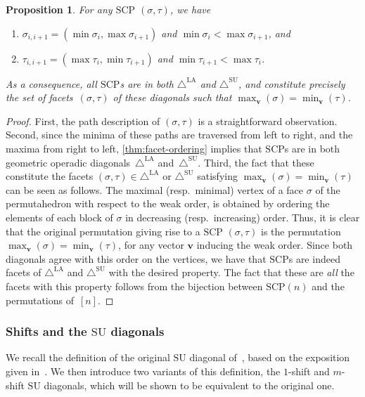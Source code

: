 \documentclass{amsart}
\newtheorem{proposition}[theorem]{Proposition}
\theoremstyle{definition}
\renewcommand{\b}[1]{{\boldsymbol{#1}}} %
\newcommand{\resp}{resp.~} %
\renewcommand{\b}[1]{\boldsymbol{#1}} %
\newcommand{\SU}{\mathrm{SU}}
\newcommand{\SUD}{\triangle^{\mathrm{SU}}}
\newcommand{\LAD}{\triangle^{\mathrm{LA}}}
\newcommand{\SCP}{\mathrm{SCP}}
\begin{document}
\begin{proposition} 
\label{lem:SCP-path-desc}
For any $\SCP$ $(\sigma,\tau)$, we have
\begin{enumerate}
\item $ \sigma_{i,i+1} = ( \min \sigma_i, \max \sigma_{i+1} )$ and $\min \sigma_i< \max \sigma_{i+1}$, and
\item $  \tau_{i,i+1} =  ( \max \tau_i, \min \tau_{i+1} )$ and $\min \tau_{i+1}< \max \tau_{i}$.
\end{enumerate}
As a consequence, all $\SCP$s are in both $\LAD$ and $\SUD$, and constitute precisely the set of facets~$(\sigma,\tau)$ of these diagonals such that $\max_{\b{v}}(\sigma) = \min_{\b{v}}(\tau)$.
\end{proposition}
\begin{proof}
First, the path description of $(\sigma,\tau)$ is a straightforward observation. 
Second, since the minima of these paths are traversed from left to right, and the maxima from right to left, \cref{thm:facet-ordering} implies that $\SCP$s are in both geometric operadic diagonals~$\LAD$ and~$\SUD$.
Third, the fact that these constitute the facets $(\sigma,\tau) \in \LAD$ or $\SUD$ satisfying $\max_{\b{v}}(\sigma) = \min_{\b{v}}(\tau)$ can be seen as follows.
The maximal (\resp minimal) vertex of a face $\sigma$ of the permutahedron with respect to the weak order, is obtained by ordering the elements of each block of $\sigma$ in decreasing (\resp increasing) order. 
Thus, it is clear that the original permutation giving rise to a $\SCP$ $(\sigma,\tau)$ is the permutation $\max_{\b{v}}(\sigma)=\min_{\b{v}}(\tau)$, for any vector $\b{v}$ inducing the weak order.
Since both diagonals agree with this order on the vertices, we have that $\SCP$s are indeed facets of $\LAD$ and $\SUD$ with the desired property. 
The fact that these are \emph{all} the facets with this property follows from the bijection between $\SCP(n)$ and the permutations of~$[n]$.
\end{proof}



\subsubsection{Shifts and the $\SU$ diagonals}
\label{subsec:SU-shifts}

We recall the definition of the original $\SU$ diagonal of~\cite{SaneblidzeUmble}, based on the exposition given in~\cite{SaneblidzeUmble-comparingDiagonals}.
We then introduce two variants of this definition, the $1$-shift and $m$-shift $\SU$ diagonals, which will be shown to be equivalent to the original one.
\end{document}
